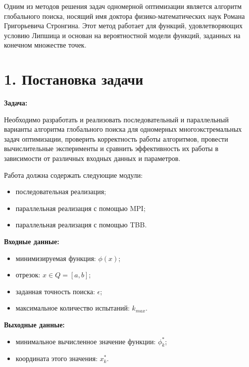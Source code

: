 \documentclass{report}
\begin{document}
Одним из методов решения задач одномерной оптимизации является алгоритм глобального поиска, носящий имя доктора физико-математических наук Романа Григорьевича Стронгина. Этот метод работает для функций, удовлетворяющих условию Липшица и основан на вероятностной модели функций, заданных на конечном множестве точек.

\newpage

\section*{1. Постановка задачи}
\textbf{Задача:}

Необходимо разработать и реализовать последовательный и параллельный варианты алгоритма глобального поиска для одномерных многоэкстремальных задач оптимизации, проверить корректность работы алгоритмов, провести вычислительные эксперименты и сравнить эффективность их работы в зависимости от различных входных данных и параметров.

Работа должна содержать следующие модули:
\begin{itemize}
  \item последовательная реализация;
  \item параллельная реализация с помощью MPI;
  \item параллельная реализация с помощью TBB.
\end{itemize}

\textbf{Входные данные:}

\begin{itemize}
  \item минимизируемая функция: $\phi (x)$;
  \item отрезок: $x \in Q=[a,b]$;
  \item заданная точность поиска: $\epsilon$;
  \item максимальное количество испытаний: $k_{max}$.
\end{itemize}

\textbf{Выходные данные:}

\begin{itemize}
  \item минимальное вычисленное значение функции: $\phi_k^*$;
  \item координата этого значения: $x_k^*$.
\end{itemize}

\newpage

\end{document}
